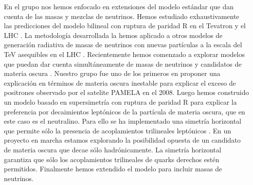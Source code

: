 En el grupo nos hemos enfocado en extensiones del modelo estándar que dan cuenta de las masas y mezclas de neutrinos. Hemos estudiado exhaustivamente las predicciones del modelo bilineal con ruptura de paridad R en el Tevatron y el LHC \cite{hep-ph/0304232,hep-ph/0501153,DeCampos:2010yu,deCampos:2008ic,deCampos:2008re,deCampos:2007bn}. La metodología desarrollada la hemos aplicado a otros modelos de generación radiativa de masas de neutrinos con nuevas partículas a la escala del TeV asequibles en el LHC \cite{Sierra:2008wj,AristizabalSierra:2006ri}. Recientemente hemos comenzado a explorar modelos que puedan dar cuenta simultáneamente de masas de neutrinos y candidatos de materia oscura \cite{Hirsch:2005ag,Choi:2010jt,Sierra:2008wj}. Nuestro grupo \cite{Nardi:2008ix} fue uno de los primeros en proponer una explicación en términos de materia oscura inestable para explicar el exceso de positrones observado por el satelite PAMELA en el 2008\cite{Adriani:2008zr}. Luego hemos construido un modelo basado en supersimetría con ruptura de paridad R para explicar la preferencia por decaimientos leptónicos de la partícula de materia oscura, que en este caso es el neutralino. Para ello se ha implementado una simetría horizontal que permite sólo la presencia de acoplamientos trilineales leptónicos \cite{Sierra:2009zq}. En un proyecto en marcha estamos explorando la posibilidad opuesta de un candidato de materia oscura que decae sólo hadrónicamente. La simetría horizontal garantiza que sólo los acoplamientos trilineales de quarks derechos estén permitidos. Finalmente hemos extendido el modelo para incluir masas de neutrinos.


